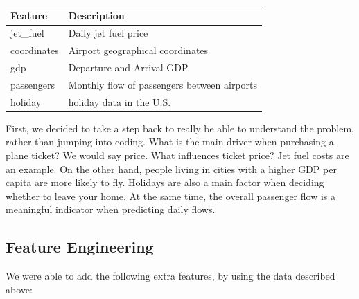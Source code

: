 \documentclass[a4paper,12pt,twoside]{article}
\begin{document}
\begin{table}[H]
	\centering
	\begin{tabular}{|l|l|}
	\hline
	\textbf{Feature} & \textbf{Description}                        \\ \hline
	jet\_fuel        & Daily jet fuel price                        \\ \hline
	coordinates      & Airport geographical coordinates            \\ \hline
	gdp              & Departure and Arrival GDP                   \\ \hline
	passengers       & Monthly flow of passengers between airports \\ \hline
	holiday          & holiday data in the U.S.                    \\ \hline
	\end{tabular}
	\label{table:additional}
\end{table}
First, we decided to take a step back to really be able to understand the problem, rather than jumping into coding. What is the main driver when purchasing a plane ticket? We would say price. What influences ticket price? Jet fuel costs are an example. On the other hand, people living in cities with a higher GDP per capita are more likely to fly.
Holidays are also a main factor when deciding whether to leave your home. At the same time, the overall passenger flow is a meaningful indicator when predicting daily flows.

\subsection{Feature Engineering}



We were able to add the following extra features, by using the data described above:
\end{document}
